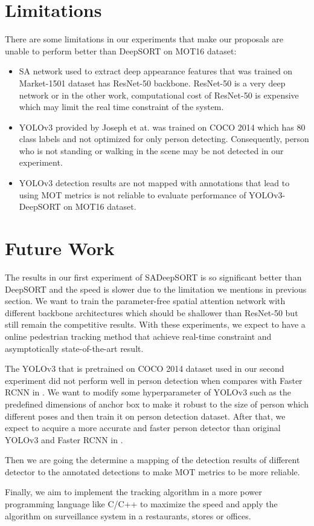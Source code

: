 \section{Limitations}
\hspace{0.45cm}There are some limitations in our experiments that make our proposals are unable to perform better than DeepSORT\cite{Wojke2017simple}
on MOT16 dataset:
\begin{itemize}
    \item \acrshort{SA} network used to extract deep appearance features that was trained on Market-1501 dataset has ResNet-50\cite{He_2016_CVPR} backbone. 
    ResNet-50\cite{He_2016_CVPR} is a very deep network or in the other work, computational cost of ResNet-50\cite{He_2016_CVPR} is expensive which may limit the real time constraint of the system.
    \item YOLOv3 provided by Joseph et at.\cite{yolov3} was trained on COCO 2014 which has 80 class labels and not optimized for only person detecting. Consequently, person who is not standing or walking in the scene may be not detected in our experiment.
    \item YOLOv3 detection results are not mapped with annotations that lead to using MOT metrics\cite{Milan2016MOT16AB} is not reliable
    to evaluate performance of YOLOv3-DeepSORT on MOT16 dataset.
\end{itemize}

\section{Future Work} 
\hspace{0.45cm} The results in our first experiment of SADeepSORT is so significant better than DeepSORT\cite{Wojke2017simple} and
the speed is slower due to the limitation we mentions in previous section. We want to train the parameter-free spatial attention
network with different backbone architectures which should be shallower than ResNet-50\cite{He_2016_CVPR} but still remain the competitive results.
With these experiments, we expect to have a online pedestrian tracking method that achieve real-time constraint and asymptotically state-of-the-art result.\par 
The YOLOv3\cite{yolov3} that is pretrained on COCO 2014 dataset used in our second experiment did not perform well in person detection 
when compares with Faster \acrshort{RCNN} in \cite{Wojke2017simple}. We want to modify some hyperparameter of YOLOv3 such as the predefined dimensions of
anchor box to make it robust to the size of person which different poses and then train it on person detection dataset. After that,
we expect to acquire a more accurate and faster person detector than original YOLOv3\cite{yolov3} and Faster \acrshort{RCNN} in \cite{Wojke2017simple}.\par 
Then we are going the determine a mapping of the detection results of different detector to the annotated detections to make
MOT metrics\cite{Milan2016MOT16AB} to be more reliable.\par
Finally, we aim to implement the tracking algorithm in a more power programming language like C/C++ to maximize the speed and apply the algorithm
on surveillance system in a restaurants, stores or offices.